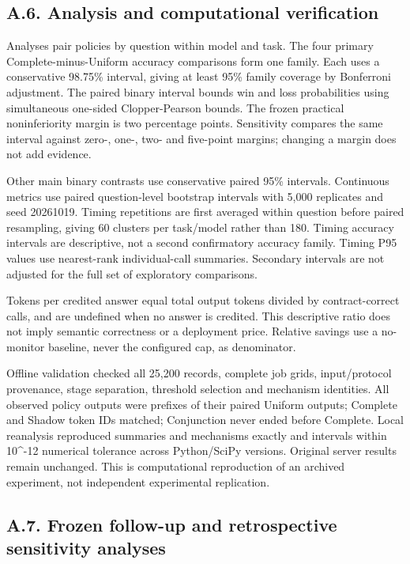 \documentclass[
  12pt,
  a4paper,
]{article}
\begin{document}
\subsection{A.6. Analysis and computational
verification}\label{a.6.-analysis-and-computational-verification}

Analyses pair policies by question within model and task. The four
primary Complete-minus-Uniform accuracy comparisons form one family.
Each uses a conservative 98.75\% interval, giving at least 95\% family
coverage by Bonferroni adjustment. The paired binary interval bounds win
and loss probabilities using simultaneous one-sided Clopper-Pearson
bounds. The frozen practical noninferiority margin is two percentage
points. Sensitivity compares the same interval against zero-, one-, two-
and five-point margins; changing a margin does not add evidence.

Other main binary contrasts use conservative paired 95\% intervals.
Continuous metrics use paired question-level bootstrap intervals with
5,000 replicates and seed 20261019. Timing repetitions are first
averaged within question before paired resampling, giving 60 clusters
per task/model rather than 180. Timing accuracy intervals are
descriptive, not a second confirmatory accuracy family. Timing P95
values use nearest-rank individual-call summaries. Secondary intervals
are not adjusted for the full set of exploratory comparisons.

Tokens per credited answer equal total output tokens divided by
contract-correct calls, and are undefined when no answer is credited.
This descriptive ratio does not imply semantic correctness or a
deployment price. Relative savings use a no-monitor baseline, never the
configured cap, as denominator.

Offline validation checked all 25,200 records, complete job grids,
input/protocol provenance, stage separation, threshold selection and
mechanism identities. All observed policy outputs were prefixes of their
paired Uniform outputs; Complete and Shadow token IDs matched;
Conjunction never ended before Complete. Local reanalysis reproduced
summaries and mechanisms exactly and intervals within 10\^{}-12
numerical tolerance across Python/SciPy versions. Original server
results remain unchanged. This is computational reproduction of an
archived experiment, not independent experimental replication.

\subsection{A.7. Frozen follow-up and retrospective sensitivity
analyses}\label{a.7.-frozen-follow-up-and-retrospective-sensitivity-analyses}
\end{document}
